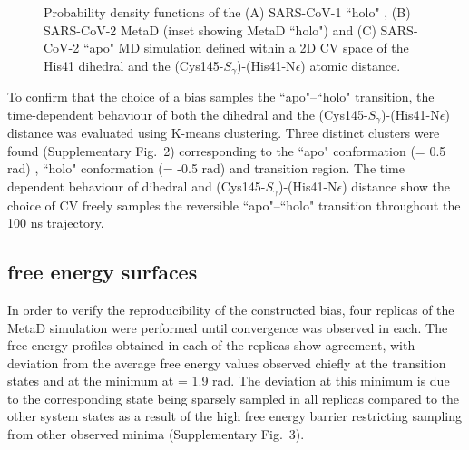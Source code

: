 \begin{figure}[h!]
  \centering
  \begin{subfigure}
    \texttt{[image: HOLO\_2DPMF.png]}
  \end{subfigure}
  \begin{subfigure}
    \texttt{[image: MetaD\_2DPMF.png]}
  \end{subfigure}
    \begin{subfigure}
    \texttt{[image: APO\_2DPMF.png]}
  \end{subfigure}
  \caption{Probability density functions of the (A) SARS-CoV-1 ``holo" , (B) SARS-CoV-2 MetaD (inset showing MetaD ``holo") and (C) SARS-CoV-2 ``apo" MD simulation defined within a 2D CV space of the His41 \dihtwo dihedral and the (Cys145-$S_{\gamma}$)-(His41-N{$\epsilon$}) atomic distance.}
  \label{fig:2DPMF}
\end{figure}


To confirm that the choice of a \dihone bias samples the ``apo"--``holo" transition, the time-dependent behaviour of both the \dihtwo dihedral and the (Cys145-$S_{\gamma}$)-(His41-N{$\epsilon$}) distance was evaluated using K-means clustering.\cite{scikit-learn} Three distinct clusters were found (Supplementary Fig.~2) corresponding to the ``apo" conformation (\dihtwo = 0.5 rad) , ``holo" conformation (\dihtwo = -0.5 rad) and transition region. The time dependent behaviour of \dihtwo dihedral and (Cys145-$S_{\gamma}$)-(His41-N{$\epsilon$}) distance show the choice of CV freely samples the reversible ``apo"--``holo" transition throughout the 100 ns trajectory.\\

\subsection*{\mpro free energy surfaces}

In order to verify the reproducibility of the constructed bias, four replicas of the MetaD simulation were performed until convergence was observed in each. The free energy profiles obtained in each of the replicas show agreement, with deviation from the average free energy values observed chiefly at the transition states and at the minimum at \dihone = 1.9 rad. The deviation at this minimum is due to the corresponding state being sparsely sampled in all replicas compared to the other system states as a result of the high free energy barrier restricting sampling from other observed minima (Supplementary Fig.~3).\\

